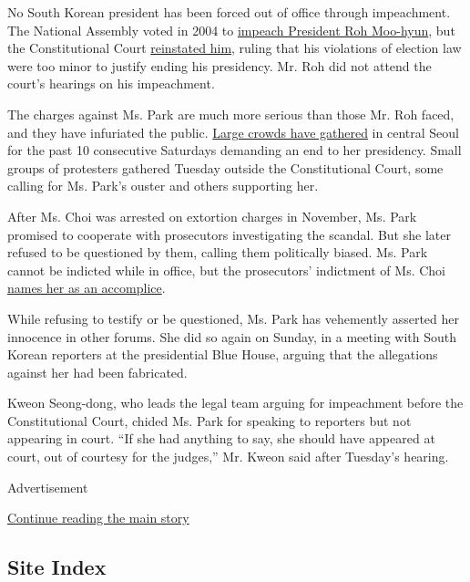 No South Korean president has been forced out of office through
impeachment. The National Assembly voted in 2004 to
\href{http://www.nytimes3xbfgragh.onion/2004/03/13/world/president-s-impeachment-stirs-angry-protests-in-south-korea.html}{impeach
President Roh Moo-hyun}, but the Constitutional Court
\href{http://www.nytimes3xbfgragh.onion/2004/05/14/world/constitutional-court-reinstates-south-korea-s-impeached-president.html}{reinstated
him}, ruling that his violations of election law were too minor to
justify ending his presidency. Mr. Roh did not attend the court's
hearings on his impeachment.

The charges against Ms. Park are much more serious than those Mr. Roh
faced, and they have infuriated the public.
\href{http://www.nytimes3xbfgragh.onion/2016/11/26/world/asia/korea-park-geun-hye-protests.html}{Large
crowds have gathered} in central Seoul for the past 10 consecutive
Saturdays demanding an end to her presidency. Small groups of protesters
gathered Tuesday outside the Constitutional Court, some calling for Ms.
Park's ouster and others supporting her.

After Ms. Choi was arrested on extortion charges in November, Ms. Park
promised to cooperate with prosecutors investigating the scandal. But
she later refused to be questioned by them, calling them politically
biased. Ms. Park cannot be indicted while in office, but the
prosecutors' indictment of Ms. Choi
\href{http://www.nytimes3xbfgragh.onion/2016/11/20/world/asia/park-geun-hye-south-korea-extortion-accomplice-prosecutors.html}{names
her as an accomplice}.

While refusing to testify or be questioned, Ms. Park has vehemently
asserted her innocence in other forums. She did so again on Sunday, in a
meeting with South Korean reporters at the presidential Blue House,
arguing that the allegations against her had been fabricated.

Kweon Seong-dong, who leads the legal team arguing for impeachment
before the Constitutional Court, chided Ms. Park for speaking to
reporters but not appearing in court. ``If she had anything to say, she
should have appeared at court, out of courtesy for the judges,'' Mr.
Kweon said after Tuesday's hearing.

Advertisement

\protect\hyperlink{after-bottom}{Continue reading the main story}

\hypertarget{site-index}{%
\subsection{Site Index}\label{site-index}}

